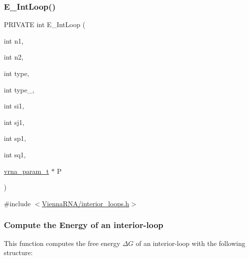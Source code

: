 \subsubsection{\texorpdfstring{E\+\_\+\+Int\+Loop()}{E\_IntLoop()}}
{\footnotesize\ttfamily P\+R\+I\+V\+A\+TE int E\+\_\+\+Int\+Loop (\begin{DoxyParamCaption}\item[{int}]{n1,  }\item[{int}]{n2,  }\item[{int}]{type,  }\item[{int}]{type\+\_,  }\item[{int}]{si1,  }\item[{int}]{sj1,  }\item[{int}]{sp1,  }\item[{int}]{sq1,  }\item[{\hyperlink{group__energy__parameters_ga8a69ca7d787e4fd6079914f5343a1f35}{vrna\+\_\+param\+\_\+t} $\ast$}]{P }\end{DoxyParamCaption})}



{\ttfamily \#include $<$\hyperlink{interior__loops_8h}{Vienna\+R\+N\+A/interior\+\_\+loops.\+h}$>$}

\subsubsection*{Compute the Energy of an interior-\/loop}

This function computes the free energy $\Delta G$ of an interior-\/loop with the following structure\+: ~\newline
 

